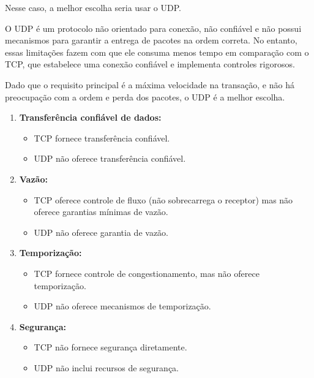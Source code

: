 \documentclass{homework}
\begin{document}
\begin{exercise}[R6)]

Nesse caso, a melhor escolha seria usar o UDP. 


O UDP é um protocolo não orientado para conexão, não confiável e não possui mecanismos para garantir a entrega de pacotes na ordem correta. No entanto, essas limitações fazem com que ele consuma menos tempo em comparação com o TCP, que estabelece uma conexão confiável e implementa controles rigorosos.

Dado que o requisito principal é a máxima velocidade na transação, e não há preocupação com a ordem e perda dos pacotes, o UDP é a melhor escolha.
    
\end{exercise}
\begin{exercise}[R8)]
    \begin{enumerate}
  \item \textbf{Transferência confiável de dados:}
  \begin{itemize}
    \item TCP fornece transferência confiável.
    \item UDP não oferece transferência confiável.
  \end{itemize}

  \item \textbf{Vazão:}
  \begin{itemize}
    \item TCP oferece controle de fluxo (não sobrecarrega o receptor) mas não oferece garantias mínimas de vazão.
    \item UDP não oferece garantia de vazão.
  \end{itemize}

  \item \textbf{Temporização:}
  \begin{itemize}
    \item TCP fornece controle de congestionamento, mas não oferece temporização.
    \item UDP não oferece mecanismos de temporização.
  \end{itemize}
  \item \textbf{Segurança:}
  \begin{itemize}
    \item TCP não fornece segurança diretamente.
    \item UDP não inclui recursos de segurança.
  \end{itemize}
\end{enumerate}
\end{exercise}
\end{document}
